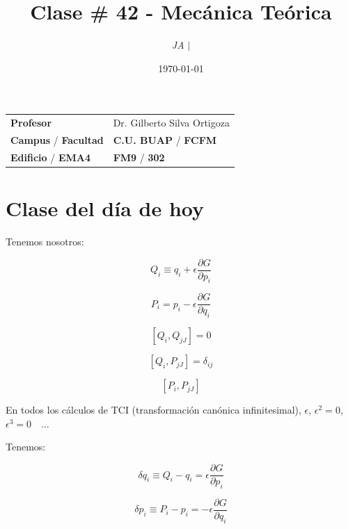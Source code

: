 \documentclass{article}
\title{Clase \# 42 - Mecánica Teórica}
\author{\emph{JA} $\boldsymbol{\mid}$}
\date{\today}
\begin{document}
\maketitle



\begin{mybox}
\noindent\begin{tabular}{@{}ll}
	{\bfseries{Profesor}} & Dr. Gilberto Silva Ortigoza\\
	\textcolor{prussianblue}{\bfseries{Campus}} / \textcolor{trueblue}{\bfseries{Facultad}}  & \textcolor{prussianblue}{\bfseries{C.U. BUAP}} /  \textcolor{trueblue}{\bfseries{FCFM}} \\
	\textcolor{prussianblue}{\bfseries{Edificio}} /  \textcolor{trueblue}{\bfseries{EMA4}}    & 	\textcolor{prussianblue}{\bfseries{FM9}} /  \textcolor{trueblue}{\bfseries{302}}   
\end{tabular} 
\end{mybox} \vspace{1cm}

\tableofcontents

\vspace{2cm}

\section{Clase del día de hoy}




Tenemos nosotros:


\[ Q_{i} \equiv q_{i} + \epsilon \frac{ \partial G }{\partial p_{i}} \]

\[ P_{i} = p_{i} - \epsilon \frac{\partial G}{\partial q_{i}} \]


\[ \left[ Q_{i},Q_{jJ}  \right] =0 \]

\[ \left[ Q_{i},P_{jJ}  \right] = \delta_{ij} \]

\[ \left[ P_{i},P_{jJ}  \right]  \]



En todos los cálculos de TCI (transformación canónica infinitesimal), $\epsilon$, $\epsilon^{2}=0$, $\epsilon^{3}=0 \quad \ldots$


Tenemos:


\[ \delta{q}_{i} \equiv Q_{i}-q_{i} = \epsilon \frac{\partial G}{\partial p_{i}}  \]


\[ \delta{p_{i}} \equiv P_{i} - p_{i} = - \epsilon \frac{\partial G  }{\partial q_{i}}  \]
\end{document}
